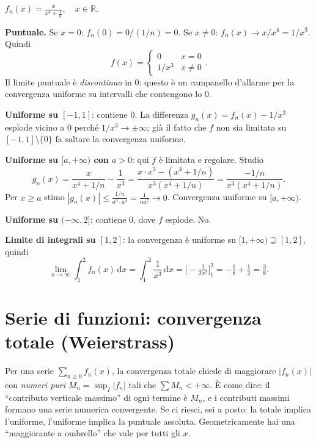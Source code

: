 \documentclass[11pt,a4paper,openany]{book}
\theoremstyle{plain}
\theoremstyle{definition}
\theoremstyle{remark}
\newcommand{\R}{\mathbb{R}}
\newcommand{\dd}{\,\mathrm{d}}
\begin{document}
\begin{esempio}[title={Tipo Sapienza --- 5/7/2023}]
$\displaystyle f_n(x)=\frac{x}{x^4+\frac1n},\quad x\in\R$.

\textbf{Puntuale.} Se $x=0$: $f_n(0)=0/(1/n)=0$. Se $x\ne 0$:
$f_n(x)\to x/x^4=1/x^3$. Quindi
\[
f(x)=\begin{cases}0 & x=0\\ 1/x^3 & x\ne 0\end{cases}.
\]
Il limite puntuale \`e \emph{discontinuo} in $0$: questo \`e un campanello
d'allarme per la convergenza uniforme su intervalli che contengono lo $0$.

\textbf{Uniforme su $[-1,1]$}: contiene $0$. La differenza
$g_n(x)=f_n(x)-1/x^3$ esplode vicino a $0$ perch\'e $1/x^3\to\pm\infty$;
gi\`a il fatto che $f$ non sia limitata su $[-1,1]\setminus\{0\}$ fa
saltare la convergenza uniforme.

\textbf{Uniforme su $[a,+\infty)$ con $a>0$}: qui $f$ \`e limitata e regolare.
Studio
\[
g_n(x)=\frac{x}{x^4+1/n}-\frac1{x^3}
=\frac{x\cdot x^3-(x^4+1/n)}{x^3(x^4+1/n)}
=\frac{-1/n}{x^3(x^4+1/n)}.
\]
Per $x\ge a$ stimo $|g_n(x)|\le \frac{1/n}{a^3\cdot a^4}=\frac{1}{n a^7}\to 0$.
Convergenza uniforme su $[a,+\infty)$.

\textbf{Uniforme su $(-\infty,2]$}: contiene $0$, dove $f$ esplode. No.

\textbf{Limite di integrali su $[1,2]$}: la convergenza \`e uniforme
su $[1,+\infty)\supseteq[1,2]$, quindi
\[
\lim_{n\to\infty}\int_1^2 f_n(x)\dd x=\int_1^2\frac{1}{x^3}\dd x=\Big[-\tfrac{1}{2x^2}\Big]_1^2=-\tfrac18+\tfrac12=\tfrac{3}{8}.
\]
\end{esempio}

\section{Serie di funzioni: convergenza totale (Weierstrass)}

\begin{nota}[title={Intuizione geometrica}]
Per una serie $\sum_{n\ge 0}f_n(x)$, la convergenza totale chiede di
maggiorare $|f_n(x)|$ con \emph{numeri puri} $M_n=\sup_I|f_n|$ tali
che $\sum M_n<+\infty$. \`E come dire: il ``contributo verticale
massimo'' di ogni termine \`e $M_n$, e i contributi massimi formano una
serie numerica convergente. Se ci riesci, sei a posto: la totale implica
l'uniforme, l'uniforme implica la puntuale assoluta. Geometricamente
hai una ``maggiorante a ombrello'' che vale per tutti gli $x$.
\end{nota}
\end{document}
